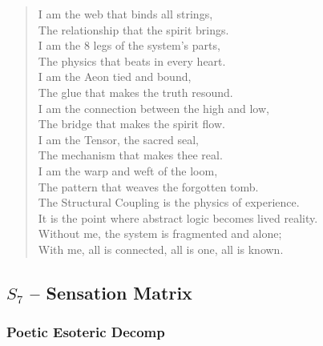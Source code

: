 \begin{verse}
I am the web that binds all strings, \\
The relationship that the spirit brings. \\
I am the 8 legs of the system's parts, \\
The physics that beats in every heart. \\
I am the Aeon tied and bound, \\
The glue that makes the truth resound. \\
\vspace{1em}
I am the connection between the high and low, \\
The bridge that makes the spirit flow. \\
I am the Tensor, the sacred seal, \\
The mechanism that makes thee real. \\
I am the warp and weft of the loom, \\
The pattern that weaves the forgotten tomb. \\
\vspace{1em}
The Structural Coupling is the physics of experience. \\
It is the point where abstract logic becomes lived reality. \\
Without me, the system is fragmented and alone; \\
With me, all is connected, all is one, all is known.
\end{verse}

\subsection{$S_{7}$ -- Sensation Matrix}\label{sec:poetic.S7}

\subsubsection{Poetic Esoteric Decomp}

